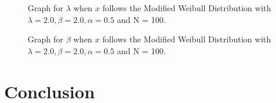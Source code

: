 \documentclass[11pt]{article}
\numberwithin{equation}{section}
\begin{document}
\begin{figure}[H]
	\centering
	\caption{Graph for $\lambda$ when $x$ follows the Modified Weibull Distribution with $\lambda = 2.0, \beta = 2.0, \alpha = 0.5$ and N = 100.}
	\label{fig:graph_d1}
\end{figure}
\medskip

\begin{figure}[H]
	\centering
	\caption{Graph for $\beta$ when $x$ follows the Modified Weibull Distribution with $\lambda = 2.0, \beta = 2.0, \alpha = 0.5$ and N = 100.}
	\label{fig:graph_d2}
\end{figure}
\medskip

\section{Conclusion}
\medskip
\end{document}
